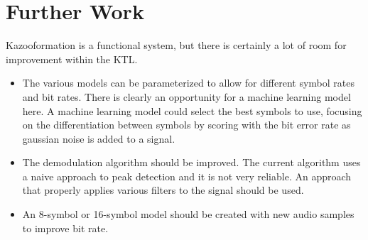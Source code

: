 \documentclass[]{article}
\begin{document}
\section{Further Work}


Kazooformation is a functional system, but there is certainly a lot of room for improvement within the KTL.

\begin{itemize}
  \item The various models can be parameterized to allow for different symbol rates and bit rates. There is clearly an opportunity for a machine learning model here. A machine learning model could select the best symbols to use, focusing on the differentiation between symbols by scoring with the bit error rate as gaussian noise is added to a signal.

  \item The demodulation algorithm should be improved. The current algorithm uses a naive approach to peak detection and it is not very reliable. An approach that properly applies various filters to the signal should be used.

  \item An 8-symbol or 16-symbol model should be created with new audio samples to improve bit rate.
\end{itemize}






\end{document}
